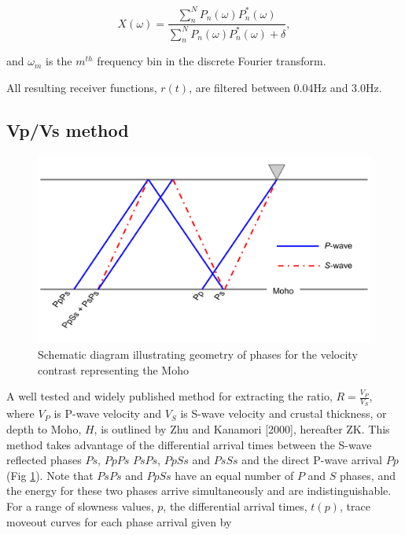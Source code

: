 \documentclass[draft, 12pt]{article}
\begin{document}
\begin{equation}
  X(\omega) = \frac {\sum_n^N P_n(\omega)P_n^*(\omega)} {\sum_n^N P_n(\omega)P_n^*(\omega) + \delta},
\end{equation}

and $\omega_m$ is the $m^{th}$ frequency bin in the discrete Fourier transform.

  All resulting receiver functions, $r(t)$, are filtered between 0.04Hz and 3.0Hz.



\subsection{Vp/Vs method} \label{section:VpVsMethod}

\begin{figure}
  \centering
    \includegraphics[width=\textwidth]{reflectedPhases}
  \caption{Schematic diagram illustrating geometry of phases for the velocity contrast representing the Moho}
  \label{fig:reflectedPhases}
\end{figure}


  A well tested and widely published method for extracting the ratio, $R=\frac{V_P}{V_S}$, where $V_P$ is P-wave velocity and $V_S$ is S-wave velocity and crustal thickness, or depth to Moho, $H$, is outlined by Zhu and Kanamori [2000], hereafter ZK. This method takes advantage of the differential arrival times between the S-wave reflected phases $Ps$, $PpPs$ $PsPs$, $PpSs$ and $PsSs$ and the direct P-wave arrival $Pp$ (Fig \ref{fig:reflectedPhases}). Note that $PsPs$ and $PpSs$ have an equal number of $P$ and $S$ phases, and the energy for these two phases arrive simultaneously and are indistinguishable. For a range of slowness values, $p$, the differential arrival times, $t(p)$, trace moveout curves for each phase arrival given by
\end{document}
